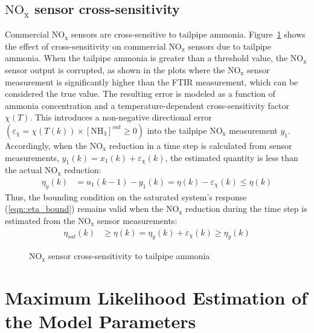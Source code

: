 \documentclass[subscriptcorrection,upint,varvw,barcolor=Goldenrod3,mathalfa=cal=euler,balance,hyphenate,french,pdf-a]{asmejour}
\newcommand{\lr}[1]{\left( #1 \right)}
\newcommand{\lrb}[1]{\left[ #1 \right]}
\newcommand{\con}[1]{\lrb{#1}}
\newcommand{\figWidth}{0.45\textwidth}
\newcommand{\nox}{\text{NO}_{\text{x}}}
\newcommand{\ammonia}{\text{NH}_{3}}
\begin{document}
\subsection{$\nox$ sensor cross-sensitivity}
Commercial $\nox$ sensors are cross-sensitive to tailpipe ammonia. Figure~\ref{fig::cross_sensitivity} shows the effect of cross-sensitivity on commercial $\nox$ sensors due to tailpipe ammonia. When the tailpipe ammonia is greater than a threshold value, the $\nox$ sensor output is corrupted, as shown in the plots where the $\nox$ sensor measurement is significantly higher than the FTIR measurement, which can be considered the true value. The resulting
error is modeled as a function of ammonia concentration and a temperature-dependent cross-sensitivity factor $\chi(T)$.
This introduces a non-negative directional error $\lr{\varepsilon_\chi= \chi\lr{T(k)} \times \con{\ammonia}^{out}\geq 0}$
into the tailpipe $\nox$ measurement $y_1$. Accordingly, when the $\nox$ reduction in a time step is calculated from
sensor measurements, $y_1(k) = x_1(k) + \varepsilon_{\chi}(k)$, the estimated quantity is less than the actual $\nox$
reduction:
\begin{align}
        \eta_y(k) &= u_1(k-1) - y_1(k) =  \eta(k) - \varepsilon_\chi(k) \leq \eta(k) \label{eqn::cross_meas}
\end{align}
Thus, the bounding condition on the saturated system's response (\ref{eqn::eta_bound}) remains valid when the $\nox$ reduction during the time step is estimated from the $\nox$ sensor measurements:
\begin{align}
        \eta_{sat}(k) &\geq \eta(k) = \eta_y(k) + \varepsilon_\chi(k) \geq \eta_y(k) \label{eqn::eta_y_bound}
\end{align}
\begin{figure}[ht]
        \centering
        \caption{$\nox$ sensor cross-sensitivity to tailpipe ammonia}
        \label{fig::cross_sensitivity}
\end{figure}
\section{Maximum Likelihood Estimation of the Model Parameters}
\end{document}
